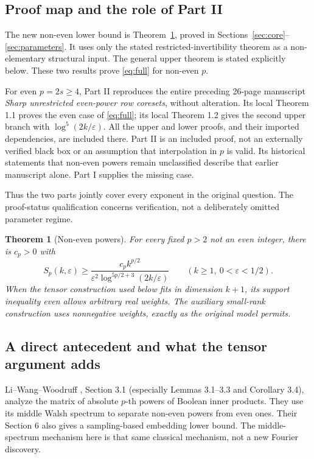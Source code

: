 \documentclass[11pt]{article}
\newtheorem{theorem}{Theorem}[section]
\theoremstyle{remark}\newtheorem{remark}[theorem]{Remark}
\newcommand{\eps}{\varepsilon}\newcommand{\norm}[1]{\left\|#1\right\|}
\begin{document}
\subsection{Proof map and the role of Part II}
The new non-even lower bound is Theorem~\ref{thm:noneven}, proved in Sections~\ref{sec:core}--\ref{sec:parameters}. It uses only the stated restricted-invertibility theorem as a non-elementary structural input. The general upper theorem is stated explicitly below. These two results prove \eqref{eq:full} for non-even $p$.

For even $p=2s\ge4$, Part II reproduces the entire preceding 26-page manuscript \emph{Sharp unrestricted even-power row coresets}, without alteration. Its local Theorem 1.1 proves the even case of \eqref{eq:full}; its local Theorem 1.2 gives the second upper branch with $\log^5(2k/\eps)$. All the upper and lower proofs, and their imported dependencies, are included there. Part II is an included proof, not an externally verified black box or an assumption that interpolation in $p$ is valid. Its historical statements that non-even powers remain unclassified describe that earlier manuscript alone. Part I supplies the missing case.

Thus the two parts jointly cover every exponent in the original question. The proof-status qualification concerns verification, not a deliberately omitted parameter regime.

\begin{theorem}[Non-even powers]\label{thm:noneven}
For every fixed $p>2$ not an even integer, there is $c_p>0$ with
\begin{equation}\label{eq:noneven}
 S_p(k,\eps)\ge \frac{c_p k^{p/2}}{\eps^2\log^{5p/2+3}(2k/\eps)}
 \qquad(k\ge1,\ 0<\eps<1/2).
\end{equation}
When the tensor construction used below fits in dimension $k+1$, its support inequality even allows arbitrary real weights. The auxiliary small-rank construction uses nonnegative weights, exactly as the original model permits.
\end{theorem}

\subsection{A direct antecedent and what the tensor argument adds}
Li--Wang--Woodruff \cite{lww}, Section 3.1 (especially Lemmas 3.1--3.3 and Corollary 3.4), analyze the matrix of absolute $p$-th powers of Boolean inner products. They use its middle Walsh spectrum to separate non-even powers from even ones. Their Section 6 also gives a sampling-based embedding lower bound. The middle-spectrum mechanism here is that same classical mechanism, not a new Fourier discovery.
\end{document}

